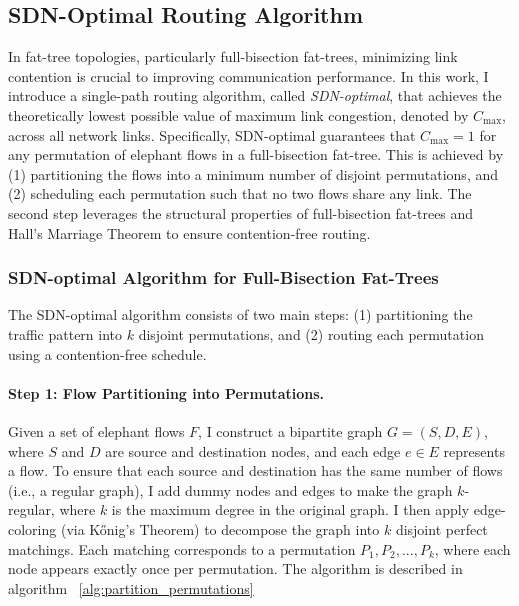 \subsection{SDN-Optimal Routing Algorithm}

In fat-tree topologies, particularly full-bisection fat-trees, minimizing link contention is crucial to improving communication performance. In this work, I introduce a single-path routing algorithm, called \textit{SDN-optimal}, that achieves the theoretically lowest possible value of maximum link congestion, denoted by \( C_{\text{max}} \), across all network links. Specifically, SDN-optimal guarantees that \( C_{\text{max}} = 1 \) for any permutation of elephant flows in a full-bisection fat-tree. This is achieved by (1) partitioning the flows into a minimum number of disjoint permutations, and (2) scheduling each permutation such that no two flows share any link. The second step leverages the structural properties of full-bisection fat-trees and Hall’s Marriage Theorem to ensure contention-free routing.

\subsubsection{SDN-optimal Algorithm for Full-Bisection Fat-Trees}

The SDN-optimal algorithm consists of two main steps: (1) partitioning the traffic pattern into \( k \) disjoint permutations, and (2) routing each permutation using a contention-free schedule.

\paragraph{Step 1: Flow Partitioning into Permutations.}  
Given a set of elephant flows \( F \), I construct a bipartite graph \( G = (S, D, E) \), where \( S \) and \( D \) are source and destination nodes, and each edge \( e \in E \) represents a flow. To ensure that each source and destination has the same number of flows (i.e., a regular graph), I add dummy nodes and edges to make the graph \( k \)-regular, where \( k \) is the maximum degree in the original graph. I then apply edge-coloring (via Kőnig’s Theorem) to decompose the graph into \( k \) disjoint perfect matchings. Each matching corresponds to a permutation \( P_1, P_2, ..., P_k \), where each node appears exactly once per permutation. The algorithm is described in algorithm ~\ref{alg:partition_permutations}


